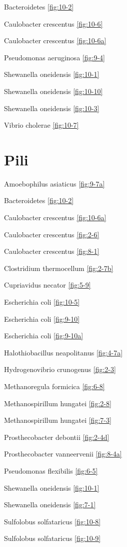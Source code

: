 \documentclass[]{tufte-book}
\begin{document}
Bacteroidetes \ref{fig:10-2}

Caulobacter crescentus \ref{fig:10-6}

Caulobacter crescentus \ref{fig:10-6a}

Pseudomonas aeruginosa \ref{fig:9-4}

Shewanella oneidensis \ref{fig:10-1}

Shewanella oneidensis \ref{fig:10-10}

Shewanella oneidensis \ref{fig:10-3}

Vibrio cholerae \ref{fig:10-7}

\hypertarget{pili}{%
\section*{Pili}\label{pili}}

Amoebophilus asiaticus \ref{fig:9-7a}

Bacteroidetes \ref{fig:10-2}

Caulobacter crescentus \ref{fig:10-6a}

Caulobacter crescentus \ref{fig:2-6}

Caulobacter crescentus \ref{fig:8-1}

Clostridium thermocellum \ref{fig:2-7b}

Cupriavidus necator \ref{fig:5-9}

Escherichia coli \ref{fig:10-5}

Escherichia coli \ref{fig:9-10}

Escherichia coli \ref{fig:9-10a}

Halothiobacillus neapolitanus \ref{fig:4-7a}

Hydrogenovibrio crunogenus \ref{fig:2-3}

Methanoregula formicica \ref{fig:6-8}

Methanospirillum hungatei \ref{fig:2-8}

Methanospirillum hungatei \ref{fig:7-3}

Prosthecobacter debontii \ref{fig:2-4d}

Prosthecobacter vanneervenii \ref{fig:8-4a}

Pseudomonas flexibilis \ref{fig:6-5}

Shewanella oneidensis \ref{fig:10-1}

Shewanella oneidensis \ref{fig:7-1}

Sulfolobus solfataricus \ref{fig:10-8}

Sulfolobus solfataricus \ref{fig:10-9}
\end{document}
